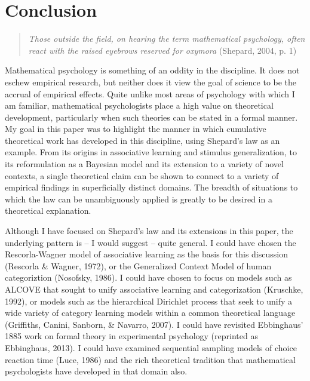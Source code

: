 \documentclass[english,doc]{apa6}
\begin{document}
\hypertarget{conclusion}{%
\section{Conclusion}\label{conclusion}}

\begin{quote}
\emph{Those outside the field, on hearing the term mathematical psychology, often react with the raised eyebrows reserved for oxymora} (Shepard, 2004, p. 1)
\end{quote}

\noindent
Mathematical psychology is something of an oddity in the discipline. It does not eschew empirical research, but neither does it view the goal of science to be the accrual of empirical effects. Quite unlike most areas of psychology with which I am familiar, mathematical psychologists place a high value on theoretical development, particularly when such theories can be stated in a formal manner. My goal in this paper was to highlight the manner in which cumulative theoretical work has developed in this discipline, using Shepard's law as an example. From its origins in associative learning and stimulus generalization, to its reformulation as a Bayesian model and its extension to a variety of novel contexts, a single theoretical claim can be shown to connect to a variety of empirical findings in superficially distinct domains. The breadth of situations to which the law can be unambiguously applied is greatly to be desired in a theoretical explanation.

Although I have focused on Shepard's law and its extensions in this paper, the underlying pattern is -- I would suggest -- quite general. I could have chosen the Rescorla-Wagner model of associative learning as the basis for this discussion (Rescorla \& Wagner, 1972), or the Generalized Context Model of human categoriztion (Nosofsky, 1986). I could have chosen to focus on models such as ALCOVE that sought to unify associative learning and categorization (Kruschke, 1992), or models such as the hierarchical Dirichlet process that seek to unify a wide variety of category learning models within a common theoretical language (Griffiths, Canini, Sanborn, \& Navarro, 2007). I could have revisited Ebbinghaus' 1885 work on formal theory in experimental psychology (reprinted as Ebbinghaus, 2013). I could have examined sequential sampling models of choice reaction time (Luce, 1986) and the rich theoretical tradition that mathematical psychologists have developed in that domain also.
\end{document}
